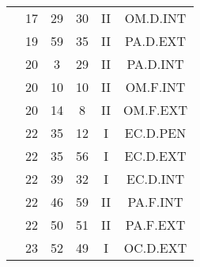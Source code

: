\documentclass[12pt, a4paper]{article}
\begin{document}
\begin{multicols}{3}
{\begin{tabular}{c c c c c c}
	 	 	 	 & 17 & 29 & 30 & II & OM.D.INT\\%
	 	 	 	 & 19 & 59 & 35 & II & PA.D.EXT\\%
	 	 	 	 & 20 & 3 & 29 & II & PA.D.INT\\%
	 	 	 	 & 20 & 10 & 10 & II & OM.F.INT\\%
	 	 	 	 & 20 & 14 & 8 & II & OM.F.EXT\\%
	 	 	 	 & 22 & 35 & 12 & I & EC.D.PEN\\%
	 	 	 	 & 22 & 35 & 56 & I & EC.D.EXT\\%
	 	 	 	 & 22 & 39 & 32 & I & EC.D.INT\\%
	 	 	 	 & 22 & 46 & 59 & II & PA.F.INT\\%
	 	 	 	 & 22 & 50 & 51 & II & PA.F.EXT\\%
	 	 	 	 & 23 & 52 & 49 & I & OC.D.EXT\\%
	 	 \end{tabular}
 	}
\end{multicols}
\end{document}
